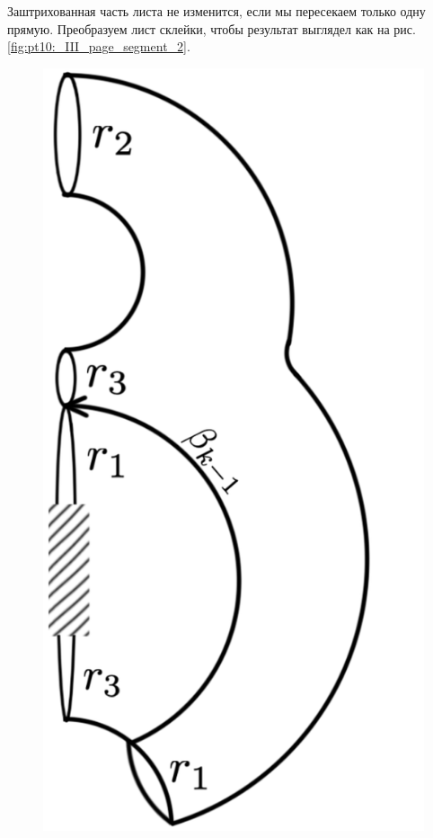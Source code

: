 Заштрихованная часть листа не изменится, если мы пересекаем только одну прямую. Преобразуем лист склейки, чтобы результат выглядел как на рис. \ref{fig:pt10:_III_page_segment_2}.

\begin{figure}[!htb]
\centering
\includegraphics[scale=0.11]{images/ch4/section3_circular/atoms/III/surface_half.pdf}

\end{figure}
